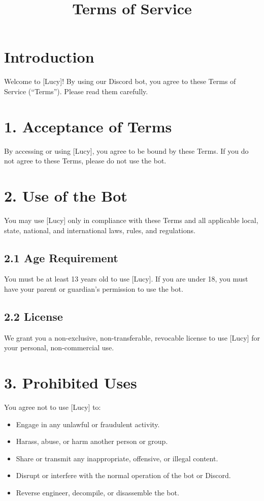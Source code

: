 \documentclass{article}
\title{Terms of Service}
\date{}
\begin{document}
\maketitle

\section*{Introduction}
Welcome to [Lucy]! By using our Discord bot, you agree to these Terms of Service (``Terms''). Please read them carefully.

\section*{1. Acceptance of Terms}
By accessing or using [Lucy], you agree to be bound by these Terms. If you do not agree to these Terms, please do not use the bot.

\section*{2. Use of the Bot}
You may use [Lucy] only in compliance with these Terms and all applicable local, state, national, and international laws, rules, and regulations.

\subsection*{2.1 Age Requirement}
You must be at least 13 years old to use [Lucy]. If you are under 18, you must have your parent or guardian’s permission to use the bot.

\subsection*{2.2 License}
We grant you a non-exclusive, non-transferable, revocable license to use [Lucy] for your personal, non-commercial use.

\section*{3. Prohibited Uses}
You agree not to use [Lucy] to:
\begin{itemize}
    \item Engage in any unlawful or fraudulent activity.
    \item Harass, abuse, or harm another person or group.
    \item Share or transmit any inappropriate, offensive, or illegal content.
    \item Disrupt or interfere with the normal operation of the bot or Discord.
    \item Reverse engineer, decompile, or disassemble the bot.
\end{itemize}
\end{document}
